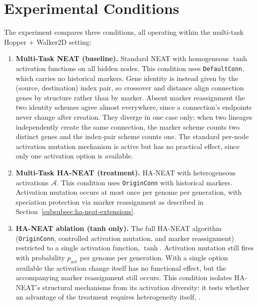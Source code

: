 \section{Experimental Conditions}
\label{subsec:experimental-conditions}

The experiment compares three conditions, all operating within the multi-task Hopper + Walker2D setting:

\begin{enumerate}
    \item \textbf{Multi-Task NEAT (baseline).} Standard NEAT with homogeneous $\tanh$ activation functions on all hidden nodes. This condition uses \texttt{DefaultConn}, which carries no historical markers. Gene identity is instead given by the (source, destination) index pair, so crossover and distance align connection genes by structure rather than by marker. Absent marker reassignment the two identity schemes agree almost everywhere, since a connection's endpoints never change after creation. They diverge in one case only: when two lineages independently create the same connection, the marker scheme counts two distinct genes and the index-pair scheme counts one. The standard per-node activation mutation mechanism is active but has no practical effect, since only one activation option is available.

    \item \textbf{Multi-Task HA-NEAT (treatment).} HA-NEAT with heterogeneous activations  $\mathcal{A}$. This condition uses \texttt{OriginConn} with historical markers. Activation mutation occurs at most once per genome per generation, with speciation protection via marker reassignment as described in Section~\ref{subsubsec:ha-neat-extensions}.

    \item \textbf{HA-NEAT ablation (tanh only).} The full HA-NEAT algorithm (\texttt{OriginConn}, controlled activation mutation, and marker reassignment) restricted to a single activation function, $\tanh$. Activation mutation still fires with probability $p_{\text{act}}$ per genome per generation. With a single option available the activation change itself has no functional effect, but the accompanying marker reassignment still occurs.
This condition isolates HA-NEAT's structural mechanisms from its activation diversity: it tests whether an advantage of the treatment requires heterogeneity itself, .
\end{enumerate}

